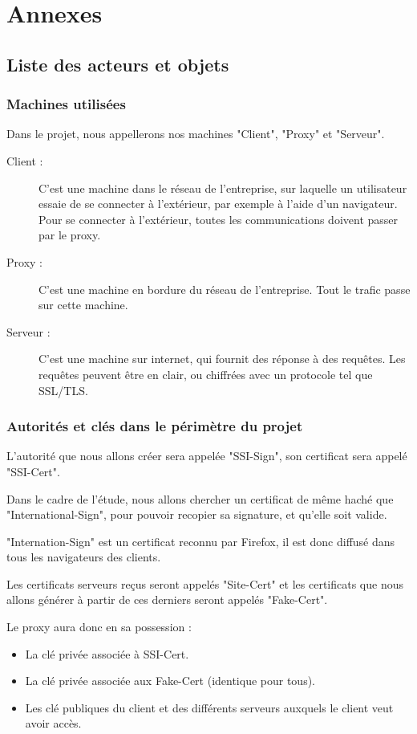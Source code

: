 \documentclass[a4paper,11pt,french]{article}
\begin{document}
\newpage
\section{Annexes}


\subsection{Liste des acteurs et objets}

\subsubsection{Machines utilisées}
Dans le projet, nous appellerons nos machines "Client", "Proxy" et "Serveur".
\begin{description}
\item[Client :] C'est une machine dans le réseau de l'entreprise, sur laquelle un utilisateur essaie de se connecter à l'extérieur, par exemple à l'aide d'un navigateur. Pour se connecter à l'extérieur, toutes les communications doivent passer par le proxy.
\item[Proxy :] C'est une machine en bordure du réseau de l'entreprise. Tout le trafic passe sur cette machine.
\item[Serveur :] C'est une machine sur internet, qui fournit des réponse à des requêtes. Les requêtes peuvent être en clair, ou chiffrées avec un protocole tel que SSL/TLS.
\end{description}





\subsubsection{Autorités et clés dans le périmètre du projet}
L'autorité que nous allons créer sera appelée "SSI-Sign", son certificat sera appelé "SSI-Cert".

Dans le cadre de l'étude, nous allons chercher un certificat de même haché que "International-Sign", pour pouvoir recopier sa signature, et qu'elle soit valide.

"Internation-Sign" est un certificat reconnu par Firefox, il est donc diffusé dans tous les navigateurs des clients.

Les certificats serveurs reçus seront appelés "Site-Cert" et les certificats que nous allons générer à partir de ces derniers seront appelés "Fake-Cert".

Le proxy aura donc en sa possession :
\begin{itemize}
\item La clé privée associée à SSI-Cert.
\item La clé privée associée aux Fake-Cert (identique pour tous).
\item Les clé publiques du client et des différents serveurs auxquels le client veut avoir accès.
\end{itemize}
\end{document}
